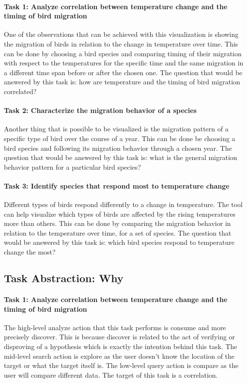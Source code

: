 \documentclass[journal]{vgtc}                %
\begin{document}
\paragraph{Task 1: Analyze correlation between temperature change and the timing of bird migration} One of the observations that can be achieved with this visualization is showing the migration of birds in relation to the change in temperature over time. This can be done by choosing a bird species and comparing timing of their migration with respect to the temperatures for the specific time and the same migration in a different time span before or after the chosen one.  The question that would be answered by this task is: how are temperature and the timing of bird migration correlated?

\paragraph{Task 2: Characterize the migration behavior of a species} Another thing that is possible to be visualized is the migration pattern of a specific type of bird over the course of a year. This can be done be choosing a bird species and following its migration behavior through a chosen year. The question that would be answered by this task is: what is the general migration behavior pattern for a particular bird species?

\paragraph{Task 3: Identify species that respond most to temperature change} Different types of birds respond differently to a change in temperature. The tool can help visualize which types of birds are affected by the rising temperatures more than others. This can be done by comparing the migration behavior in relation to the temperature over time, for a set of species. The question that would be answered by this task is: which bird species respond to temperature change the most?

\subsection{Task Abstraction: Why}

\paragraph{Task 1: Analyze correlation between temperature change and the timing of bird migration} The high-level analyze action that this task performs is consume and more precisely discover. This is because discover is related to the act of verifying or disproving of a hypothesis which is exactly the intention behind this task. The mid-level search action is explore as the user doesn't know the location of the target or what the target itself is. The low-level query action is compare as the user will compare different data. The target of this task is a correlation.
\end{document}
